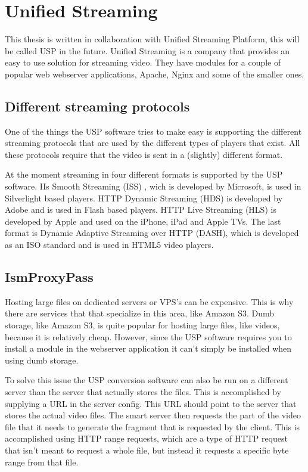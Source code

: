 \documentclass[twoside,openright]{uva-bachelor-thesis}
\begin{document}
\section{Unified Streaming}
This thesis is written in collaboration with Unified Streaming Platform, this
will be called USP in the future. Unified Streaming is a company that provides an easy to use
solution for streaming video. They have modules for a couple of popular web
webserver applications, Apache, Nginx and some of the smaller ones.


\subsection{Different streaming protocols}
One of the things the USP software tries to make easy is supporting the
different streaming protocols that are used by the different types of players
that exist. All these protocols require that the video is sent in a (slightly)
different format.

At the moment streaming in four different formats is supported by the USP
software. IIs Smooth Streaming (ISS) \autocite{smooth}, wich is developed by
Microsoft, is used in Silverlight based players. HTTP Dynamic Streaming (HDS)
\autocite{hds} is developed by Adobe and is used in Flash based players. HTTP Live
Streaming (HLS) \autocite{hls} is developed by Apple and used on the iPhone, iPad
and Apple TVs. The last format is Dynamic Adaptive Streaming over HTTP (DASH),
which is developed as an ISO standard and is used in HTML5 video players.


\subsection{IsmProxyPass}
Hosting large files on dedicated servers or VPS's can be expensive. This is why
there are services that that specialize in this area, like Amazon S3.
Dumb storage, like Amazon S3, is quite popular for hosting large files, like
videos, because it is relatively cheap. However, since the USP software requires
you to install a module in the webserver application it can't simply be
installed when using dumb storage.

To solve this issue the USP conversion software can also be run on a different
server than the server that actually stores the files. This is accomplished by
supplying a URL in the server config. This URL should point to the server that
stores the actual video files. The smart server then requests the part of the
video file that it needs to generate the fragment that is requested by the
client. This is accomplished using HTTP range requests\autocite{rangerequests},
which are a type of HTTP request that isn't meant to request a whole file, but
instead it requests a specific byte range from that file.
\end{document}
